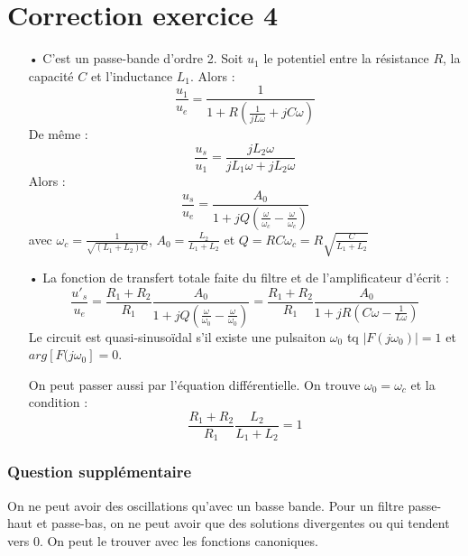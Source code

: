 \documentclass{report}
\begin{document}
\section*{Correction exercice 4}

\begin{itemize}
	\item[•] C'est un passe-bande d'ordre 2. Soit $u_1$ le potentiel entre la résistance $R$, la capacité $C$ et l'inductance $L_1$. Alors :
	\begin{equation}
		\frac{u_1}{u_e}=\frac{1}{1+R\left(\frac{1}{jL\omega}+ jC\omega \right) }
	\end{equation}
	De même :
	\begin{equation}
		\frac{u_s}{u_1}=\frac{jL_2\omega}{jL_1\omega+jL_2\omega}
	\end{equation}
	Alors : 
	\begin{equation}
		\frac{u_s}{u_e}=\frac{A_0}{1+jQ\left( \frac{\omega}{\omega_c}- \frac{\omega}{\omega_c}\right)}
	\end{equation}
	avec $\omega_c=\frac{1}{\sqrt{(L_1+L_2)C}}$, $A_0=\frac{L_2}{L_1+L_2}$ et $Q=RC\omega_c=R\sqrt{\frac{C}{L_1+L_2}}$
	
	\item[•] La fonction de transfert totale faite du filtre et de l'amplificateur d'écrit : 
		\begin{equation}
		\frac{u'_s}{u_e}=\frac{R_1+R_2}{R_1}\frac{A_0}{1+jQ\left( \frac{\omega}{\omega_0}- \frac{\omega}{\omega_0}\right)}=\frac{R_1+R_2}{R_1}\frac{A_0}{1+jR\left(C\omega- \frac{1}{L\omega}\right)}
	\end{equation}
	Le circuit est quasi-sinusoïdal s'il existe une pulsaiton $\omega_0$ tq $\mid F(j\omega_0)\mid=1$ et $arg\left[F(j\omega_0 \right] =0 $.
	
	On peut passer aussi par l'équation différentielle.
	On trouve $\omega_0=\omega_c$ et la condition :
	\begin{equation}
		\frac{R_1+R_2}{R_1}\frac{L_2}{L_1+L_2}=1
	\end{equation}
\end{itemize}

\subsubsection{Question supplémentaire}

On ne peut avoir des oscillations qu'avec un basse bande. Pour un filtre passe-haut et passe-bas, on ne peut avoir que des solutions divergentes ou qui tendent vers 0. On peut le trouver avec les fonctions canoniques.
	
\end{document}

